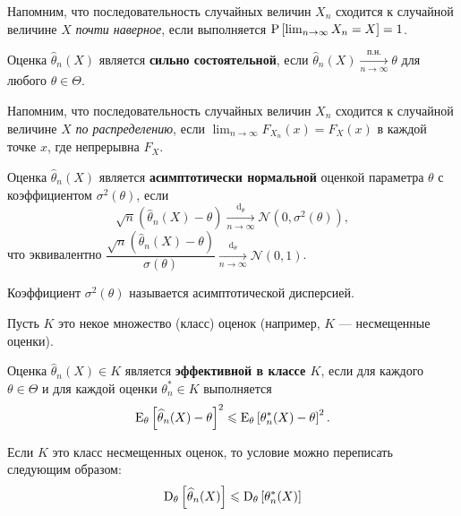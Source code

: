 Напомним, что последовательность случайных величин $X_n$ сходится к случайной величине $X$ \textit{почти наверное}, если выполняется $\P\left[\lim_{n \to \infty} X_n = X \right] = 1$.

\begin{definition*}
    Оценка $\widehat{\theta}_n(X)$ является \textbf{сильно состоятельной}, если $\widehat{\theta}_n(X) \xrightarrow[n \to \infty]{\text{п.н.}} \theta$ для любого $\theta \in \Theta$.
\end{definition*}

Напомним, что последовательность случайных величин $X_n$ сходится к случайной величине $X$ \textit{по распределению}, если $\lim_{n \to \infty} F_{X_n}(x) = F_X(x)$ в каждой точке $x$, где непрерывна $F_X$.

\begin{definition*}
    Оценка $\widehat{\theta}_n(X)$ является \textbf{асимптотически нормальной} оценкой параметра $\theta$ с коэффициентом $\sigma^2 (\theta)$, если
    \begin{equation*}
        \sqrt{n} \left( \widehat{\theta}_n(X) - \theta \right) \xrightarrow[n \to \infty]{\operatorname{d}_{\theta}} \mathcal{N}(0, \sigma^2 (\theta)),
    \end{equation*}
    что эквивалентно $\dfrac{\sqrt{n} \left( \widehat{\theta}_n(X) - \theta \right)}{\sigma(\theta)} \xrightarrow[n \to \infty]{\operatorname{d}_{\theta}} \mathcal{N}(0, 1)$.

    Коэффициент $\sigma^2(\theta)$ называется асимптотической дисперсией.
\end{definition*}

\begin{definition*}
    Пусть $K$ это некое множество (класс) оценок (например, $K$ --- несмещенные оценки).

    Оценка $\widehat{\theta}_n(X) \in K$ является \textbf{эффективной в классе $K$}, если для каждого $\theta \in \Theta$ и для каждой оценки $\theta^*_n \in K$ выполняется
    \begin{equation*}
        \E_{\theta} \left[ \widehat{\theta}_n(X) - \theta \right]^2 \leq \E_{\theta} \left[ \theta^*_n(X) - \theta \right]^2.
    \end{equation*}
\end{definition*}

Если $K$ это класс несмещенных оценок, то условие можно переписать следующим образом:
\begin{equation*}
    \D_{\theta} \left[ \widehat{\theta}_n(X) \right] \leq \D_{\theta} \left[ \theta_n^*(X) \right]
\end{equation*}


